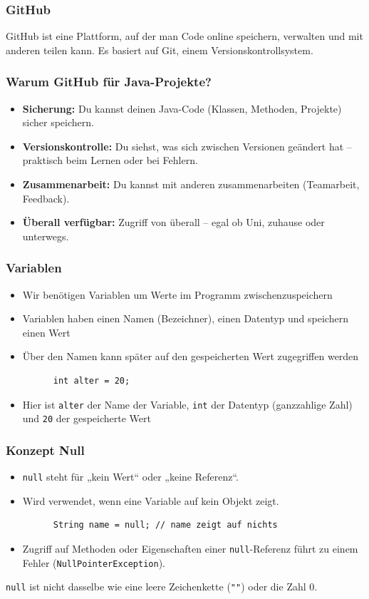 \documentclass{../../presentation}
\begin{document}
\begin{frame}
  \frametitle{GitHub}
  GitHub ist eine Plattform, auf der man Code online speichern, verwalten und mit anderen teilen kann. Es basiert auf Git, einem Versionskontrollsystem.
\end{frame}

\begin{frame}
  \frametitle{Warum GitHub für Java-Projekte?}
  \begin{itemize}
    \item \textbf{Sicherung:} Du kannst deinen Java-Code (Klassen, Methoden, Projekte) sicher speichern.
    \item \textbf{Versionskontrolle:} Du siehst, was sich zwischen Versionen geändert hat – praktisch beim Lernen oder bei Fehlern.
    \item \textbf{Zusammenarbeit:} Du kannst mit anderen zusammenarbeiten (Teamarbeit, Feedback).
    \item \textbf{Überall verfügbar:} Zugriff von überall – egal ob Uni, zuhause oder unterwegs.
  \end{itemize}
\end{frame}

\begin{frame}[fragile]
  \frametitle{Variablen}
  \begin{itemize}
    \item Wir benötigen Variablen um Werte im Programm zwischenzuspeichern
    \item Variablen haben einen Namen (Bezeichner), einen Datentyp und speichern einen Wert
    \item Über den Namen kann später auf den gespeicherten Wert zugegriffen werden
          \begin{verbatim}
      int alter = 20;
    \end{verbatim}
    \item Hier ist \texttt{alter} der Name der Variable, \texttt{int} der Datentyp (ganzzahlige Zahl) und \texttt{20} der gespeicherte Wert
  \end{itemize}
\end{frame}

\begin{frame}[fragile]
  \frametitle{Konzept Null}
  \begin{itemize}
    \item \texttt{null} steht für „kein Wert“ oder „keine Referenz“.
    \item Wird verwendet, wenn eine Variable auf kein Objekt zeigt.
          \begin{verbatim}
      String name = null; // name zeigt auf nichts
      \end{verbatim}
    \item Zugriff auf Methoden oder Eigenschaften einer \texttt{null}-Referenz führt zu einem Fehler (\texttt{NullPointerException}).
  \end{itemize}
  \achtung{} \texttt{null} ist nicht dasselbe wie eine leere Zeichenkette (\texttt{""}) oder die Zahl 0.
\end{frame}
\end{document}
